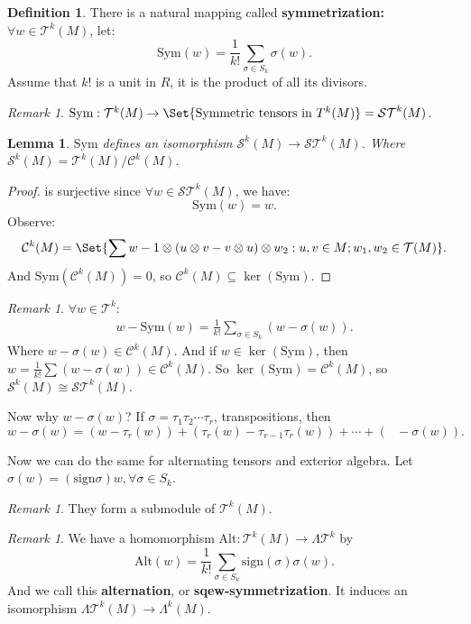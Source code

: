 \documentclass[9pt,reqno,twoside]{amsbook}
\theoremstyle{plain}
\numberwithin{section}{chapter}
\numberwithin{equation}{chapter}
\newtheorem{lem}[theorem]{Lemma}
\theoremstyle{definition}
\newtheorem{Def}[theorem]{Definition}
\theoremstyle{remark}
\newtheorem{rem}[theorem]{Remark}
\theoremstyle{plain}
\newcommand{\sub}{\subseteq}
\newcommand{\mc}{\mathcal}
\newcommand{\bee}{\begin{equation}\begin{aligned}}
\newcommand{\eee}{\end{aligned}\end{equation}}
\newcommand{\fracc}{\frac}
\newcommand{\tens}{\otimes}
\renewcommand{\tt}{\text}
\begin{document}
\begin{Def}
There is a natural mapping called \textbf{symmetrization: }$\forall w \in \mc{T}^k(M)$, let:
$$
\tt{Sym}(w) = \fracc{1}{k!}\sum_{\sigma \in S_k} \sigma(w).
$$
Assume that $k!$ is a unit in $R$, it is the product of all its divisors. 

\end{Def}

\begin{rem}
$\tt{Sym}:\mc{T}^k(M) \to \Set{\text{Symmetric tensors in } T^k(M)} = \mc{ST}^k(M)$. 
\end{rem}

\begin{lem}
$\tt{Sym}$ defines an isomorphism $\mc{S}^k(M) \to \mc{ST}^k(M)$. Where $\mc{S}^k(M) = \mc{T}^k(M)/\mc{C}^k(M)$. 
\end{lem}

\begin{proof}
 is surjective since $\forall w \in \mc{ST}^k(M)$, we have:
$$
\tt{Sym}(w) = w.
$$
Observe:
$$
\mc{C}^k(M) = \Set{\sum w-1 \tens (u \tens v - v \tens u) \tens w_2: u,v \in M;w_1,w_2 \in \mc{T}(M)}.
$$
And $\tt{Sym}(\mc{C}^k(M)) = 0$, so $\mc{C}^k(M) \sub \ker(\tt{Sym})$. 
\end{proof}


\begin{rem}
$\forall w \in \mc{T}^k$:
\bee
w - \tt{Sym}(w) = \fracc{1}{k!}\sum_{\sigma \in S_k}(w - \sigma(w)).
\eee
Where $w - \sigma(w) \in \mc{C}^k(M)$. And if $w \in \ker(\tt{Sym})$, then $w = \fracc{1}{k!}\sum(w - \sigma(w)) \in \mc{C}^k(M)$. So $\ker(\tt{Sym}) = \mc{C}^k(M)$, so $\mc{S}^k(M) \cong \mc{ST}^k(M)$. 


Now why $w - \sigma(w)$? If $\sigma = \tau_1\tau_2 \cdots \tau_r$, transpositions, then 
$$
w - \sigma(w) = (w - \tau_r(w)) + (\tau_r(w) - \tau_{r - 1}\tau_r(w)) + \cdots + (\tt{    } - \sigma(w)).
$$
\end{rem}

Now we can do the same for alternating tensors and exterior algebra. Let $\sigma(w) = (\tt{sign}\sigma)w, \forall \sigma \in S_k$. 

\begin{rem}
They form a submodule of $\mc{T}^k(M)$. 
\end{rem}

\begin{rem}
We have a homomorphism $\tt{Alt}: \mc{T}^k(M) \to \Lambda\mc{T}^k$ by 
$$
\tt{Alt}(w) = \fracc{1}{k!}\sum_{\sigma \in S_k}\tt{sign}(\sigma)\sigma(w).
$$
And we call this \textbf{alternation}, or \textbf{sqew-symmetrization}. It induces an isomorphism $\Lambda\mc{T}^k(M) \to \Lambda^k(M)$. 
\end{rem}
\end{document}
